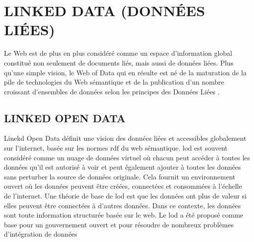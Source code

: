 \documentclass[12pt]{report}
\begin{document}
\section{LINKED DATA (DONNÉES LIÉES)}
Le Web est de plus en plus considéré comme un espace d’information global constitué non seulement de documents liés, mais aussi de données liées. Plus qu’une simple vision, le Web of Data qui en résulte est né de la maturation de la pile de technologies du Web sémantique et de la publication d’un nombre croissant d’ensembles de données selon les principes des Données Liées
\cite{LDOW}.
\subsection{LINKED OPEN DATA}
Linekd Open Data définit une vision des données liées et accessibles globalement sur l'internet, basée sur
les normes \acs{rdf} du web sémantique. \acs{lod} est souvent considéré comme un nuage de données virtuel où
chacun peut accéder à toutes les données qu'il est autorisé à voir et peut également ajouter à toutes les
données sans perturber la source de données originale. Cela fournit un environnement ouvert où les
données peuvent être créées, connectées et consommées à l'échelle de l'internet. Une théorie de base de
\acs{lod} est que les données ont plus de valeur si elles peuvent être connectées à d'autres données. Dans ce
contexte, les données sont toute information structurée basée sur le web.
Le \acs{lod} a été proposé comme base pour un gouvernement ouvert et pour résoudre de nombreux
problèmes d'intégration de données
\end{document}
